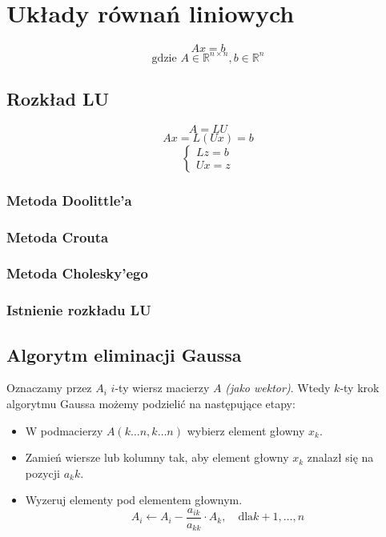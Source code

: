 \documentclass[../mn-notatki.tex]{subfiles}
\begin{document}
\section{Układy równań liniowych}

\begin{tcolorbox}
\[
Ax = b
\]
\[
\text{gdzie } A \in \mathbb{R}^{n \times n}, b \in \mathbb{R}^n
\]
\end{tcolorbox}

\subsection{Rozkład LU}

\begin{tcolorbox}
\[
A = LU
\]
\[
Ax = L(Ux) = b
\]
\[
\begin{cases}
Lz = b\\
Ux = z
\end{cases}
\]
\end{tcolorbox}

\subsubsection{Metoda Doolittle'a}
\subsubsection{Metoda Crouta}
\subsubsection{Metoda Cholesky'ego}
\subsubsection{Istnienie rozkładu LU}

\subsection{Algorytm eliminacji Gaussa}

Oznaczamy przez $A_i$ $i$-ty wiersz macierzy $A$ \textit{(jako wektor)}.
Wtedy $k$-ty krok algorytmu Gaussa możemy podzielić na następujące etapy:
\begin{itemize}
    \item W podmacierzy $A(k\ldots n, k\ldots n)$ wybierz element głowny $x_k$.
    \item Zamień wiersze lub kolumny tak, aby element głowny $x_k$ znalazł się
    na pozycji $a_kk$.
    \item Wyzeruj elementy pod elementem głownym.
    \[
    A_i \leftarrow A_i - \frac{a_{ik}}{a_{kk}} \cdot A_k, \text{~~ dla} k+1, \ldots, n
    \]
\end{itemize}
\end{document}
